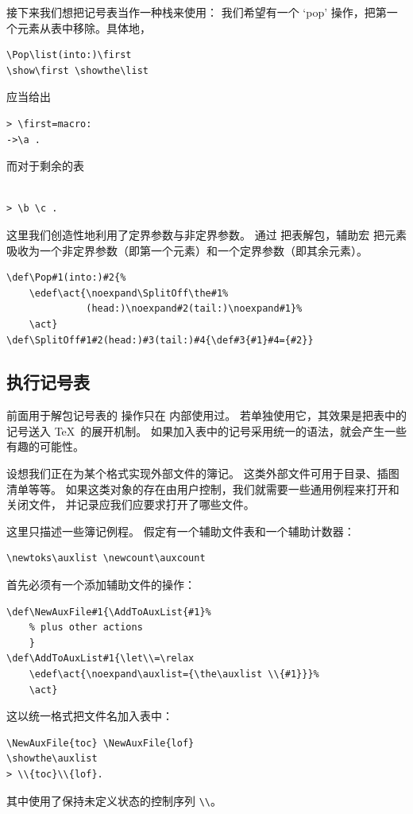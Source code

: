 \documentclass[a4paper]{rapport3}
\begin{document}
接下来我们想把记号表当作一种栈来使用：
我们希望有一个 `pop' 操作，把第一个元素从表中移除。具体地，
\begin{verbatim}
\Pop\list(into:)\first
\show\first \showthe\list
\end{verbatim}
应当给出
\begin{verbatim}
> \first=macro:
->\a .
\end{verbatim}
而对于剩余的表
\begin{verbatim}
 
> \b \c .
\end{verbatim}

这里我们创造性地利用了定界参数与非定界参数。
通过  把表解包，辅助宏  把元素
吸收为一个非定界参数（即第一个元素）和一个定界参数（即其余元素）。\begin{verbatim}
\def\Pop#1(into:)#2{%
    \edef\act{\noexpand\SplitOff\the#1%
              (head:)\noexpand#2(tail:)\noexpand#1}%
    \act}
\def\SplitOff#1#2(head:)#3(tail:)#4{\def#3{#1}#4={#2}}
\end{verbatim}

\subsection{执行记号表}

前面用于解包记号表的  操作只在  内部使用过。
若单独使用它，其效果是把表中的记号送入 \TeX\ 的展开机制。
如果加入表中的记号采用统一的语法，就会产生一些有趣的可能性。

设想我们正在为某个格式实现外部文件的簿记。
这类外部文件可用于目录、插图清单等等。
如果这类对象的存在由用户控制，我们就需要一些通用例程来打开和关闭文件，
并记录应我们应要求打开了哪些文件。

这里只描述一些簿记例程。
假定有一个辅助文件表和一个辅助计数器： \begin{verbatim}
\newtoks\auxlist \newcount\auxcount
\end{verbatim}
首先必须有一个添加辅助文件的操作：
\begin{verbatim}
\def\NewAuxFile#1{\AddToAuxList{#1}%
    % plus other actions
    }
\def\AddToAuxList#1{\let\\=\relax
    \edef\act{\noexpand\auxlist={\the\auxlist \\{#1}}}%
    \act}
\end{verbatim}
这以统一格式把文件名加入表中：
\begin{verbatim}
\NewAuxFile{toc} \NewAuxFile{lof}
\showthe\auxlist
> \\{toc}\\{lof}.
\end{verbatim}
其中使用了保持未定义状态的控制序列 \verb>\\>。
\end{document}
